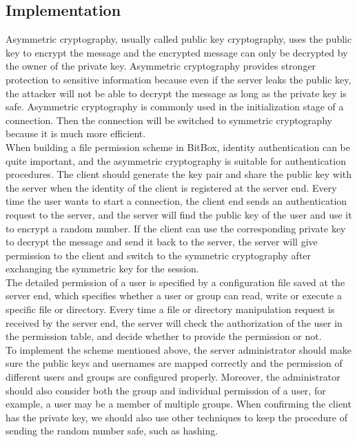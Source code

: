 \documentclass[a4paper,10pt,titlepage,twocolumn]{article}
\begin{document}
    \subsection{Implementation}
    Asymmetric cryptography, usually called public key cryptography, uses the public key to encrypt the message and the encrypted message can only be decrypted by the owner of the private key. Asymmetric cryptography provides stronger protection to sensitive information because even if the server leaks the public key, the attacker will not be able to decrypt the message as long as the private key is safe. Asymmetric cryptography is commonly used in the initialization stage of a connection. Then the connection will be switched to symmetric cryptography because it is much more efficient.
    \\When building a file permission scheme in BitBox, identity authentication can be quite important, and the asymmetric cryptography is suitable for authentication procedures. The client should generate the key pair and share the public key with the server when the identity of the client is registered at the server end. Every time the user wants to start a connection, the client end sends an authentication request to the server, and the server will find the public key of the user and use it to encrypt a random number. If the client can use the corresponding private key to decrypt the message and send it back to the server, the server will give permission to the client and switch to the symmetric cryptography after exchanging the symmetric key for the session. 
    \\The detailed permission of a user is specified by a configuration file saved at the server end, which specifies whether a user or group can read, write or execute a specific file or directory. Every time a file or directory manipulation request is received by the server end, the server will check the authorization of the user in the permission table, and decide whether to provide the permission or not.
    \\To implement the scheme mentioned above, the server administrator should make sure the public keys and usernames are mapped correctly and the permission of different users and groups are configured properly. Moreover, the administrator should also consider both the group and individual permission of a user, for example, a user may be a member of multiple groups. When confirming the client has the private key, we should also use other techniques to keep the procedure of sending the random number safe, such as hashing.
\end{document}

